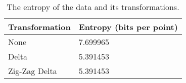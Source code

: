 \begin{table}
    \caption{\label{tab:entropy} The entropy of the data and its transformations.}
    \begin{tabular}{|l|l|}
        \hline
	    Transformation & Entropy (bits per point)\\
        \hline
None & 7.699965\\
Delta & 5.391453\\
Zig-Zag Delta & 5.391453\\
	\hline
    \end{tabular}
\end{table}
